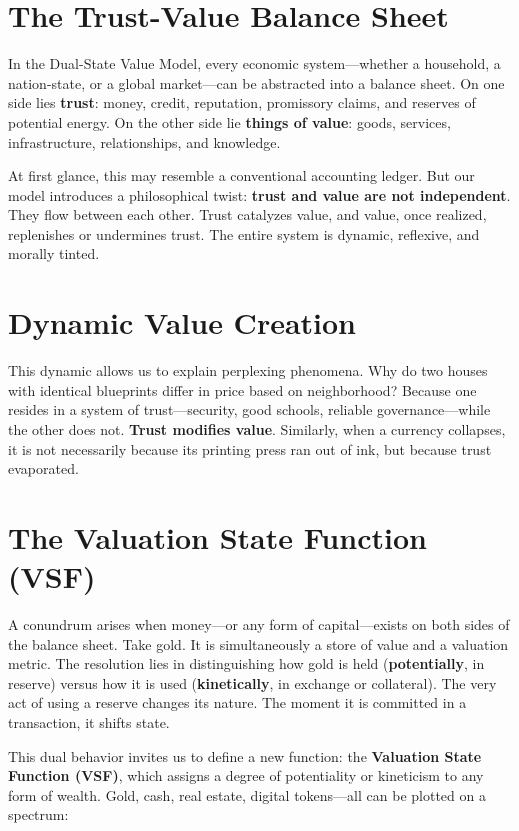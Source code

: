 \documentclass[11pt,oneside]{book}
\begin{document}
\section{The Trust-Value Balance Sheet}

In the Dual-State Value Model, every economic system—whether a household, a nation-state, or a global market—can be abstracted into a balance sheet. On one side lies \textbf{trust}: money, credit, reputation, promissory claims, and reserves of potential energy. On the other side lie \textbf{things of value}: goods, services, infrastructure, relationships, and knowledge.

At first glance, this may resemble a conventional accounting ledger. But our model introduces a philosophical twist: \textbf{trust and value are not independent}. They flow between each other. Trust catalyzes value, and value, once realized, replenishes or undermines trust. The entire system is dynamic, reflexive, and morally tinted.

\section{Dynamic Value Creation}

This dynamic allows us to explain perplexing phenomena. Why do two houses with identical blueprints differ in price based on neighborhood? Because one resides in a system of trust—security, good schools, reliable governance—while the other does not. \textbf{Trust modifies value}. Similarly, when a currency collapses, it is not necessarily because its printing press ran out of ink, but because trust evaporated.

\section{The Valuation State Function (VSF)}

A conundrum arises when money—or any form of capital—exists on both sides of the balance sheet. Take gold. It is simultaneously a store of value and a valuation metric. The resolution lies in distinguishing how gold is held (\textbf{potentially}, in reserve) versus how it is used (\textbf{kinetically}, in exchange or collateral). The very act of using a reserve changes its nature. The moment it is committed in a transaction, it shifts state.

This dual behavior invites us to define a new function: the \textbf{Valuation State Function (VSF)}, which assigns a degree of potentiality or kineticism to any form of wealth. Gold, cash, real estate, digital tokens—all can be plotted on a spectrum:
\end{document}
